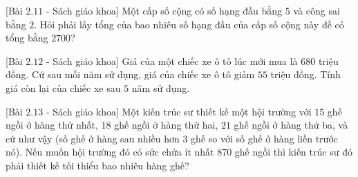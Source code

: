 \begin{bt}%
[Bài $2.11$ - Sách giáo khoa]%
	Một cấp số cộng có số hạng đầu bằng $5$ và công sai bằng $2$. Hỏi phải lấy tổng của bao nhiêu số hạng đầu của cấp số cộng này đề có tổng bằng $2700$?
\end{bt}

\begin{bt}%
[Bài $2.12$ - Sách giáo khoa]%
	Giá của một chiếc xe ô tô lúc mới mua là 680 triệu đồng. Cứ sau mỗi năm sử dụng, giá của chiếc xe ô tô giảm $55$ triệu đồng. Tính giá còn lại của chiếc xe sau $5$ năm sử dụng.
\end{bt}

\begin{bt}%
[Bài $2.13$ - Sách giáo khoa]%
	Một kiến trúc sư thiết kế một hội trường với $15$ ghế ngồi ở hàng thứ nhất, $18$ ghế ngồi ở hàng thứ hai, $21$ ghế ngồi ở hàng thứ ba, và cứ như vậy (số ghế ở hàng sau nhiều hơn $3$ ghế so với số ghế ở hàng liền trước nó). Nếu muốn hội trường đó có sức chứa ít nhất 870 ghế ngồi thì kiến trúc sư đó phải thiết kế tối thiểu bao nhiêu hàng ghế?
\end{bt}

